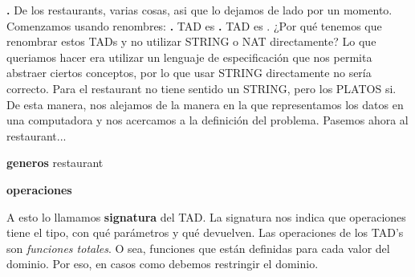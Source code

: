\documentclass[10pt,a4paper]{article}
\begin{document}
\newline
\textbf{.} De los restaurants, varias cosas, asi que lo dejamos de lado por un momento.
\newpage
Comenzamos usando renombres:
\newline
\newline
\textbf{.} TAD  es   
\newline
\newline
\textbf{.} TAD  es .
\newline
\newline
¿Por qué tenemos que renombrar estos TADs y no utilizar STRING o NAT directamente? Lo que queriamos hacer era utilizar un lenguaje de especificación que nos permita abstraer ciertos conceptos, por lo que usar STRING directamente no sería correcto. Para el restaurant no tiene sentido un STRING, pero los PLATOS si. De esta manera, nos alejamos de la manera en la que representamos los datos en una computadora y nos acercamos a la definición del problema.
\newline
\newline
Pasemos ahora al restaurant...
\newline
\begin{tad}{}
	\medskip	
	\textbf{generos} restaurant
	\newline
	
	\textbf{operaciones}
	\medskip
	\medskip
	\medskip
	\medskip
	\medskip
	\medskip
	\medskip
	\medskip
	\medskip
	\medskip
\end{tad}
\medskip
A esto lo llamamos \textbf{signatura} del TAD. La signatura nos indica que operaciones tiene el tipo, con qué parámetros y qué devuelven.
\newline
\newline
Las operaciones de los TAD's son \textit{funciones totales}. O sea, funciones que están definidas para cada valor del dominio. Por eso, en casos como  debemos restringir el dominio.
\end{document}
